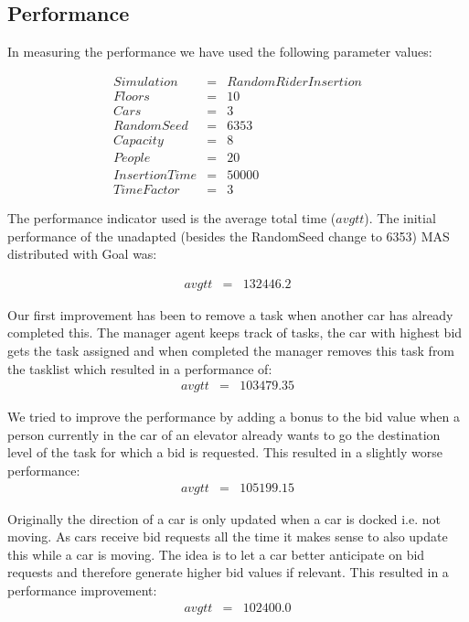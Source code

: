 \documentclass[a4paper,11pt]{article}
\begin{document}
\subsection{Performance}
In measuring the performance we have used the following parameter values:

\[\begin{array}{lcl}
Simulation & = & Random Rider Insertion\\
Floors & = & 10\\
Cars & = & 3\\
RandomSeed & = & 6353\\
Capacity & = & 8\\
People & = & 20\\
InsertionTime & = & 50000\\
TimeFactor & = & 3
\end{array}\] 

\pagebreak

The performance indicator used is the average total time ($avgtt$). The initial performance of the unadapted (besides the RandomSeed change to 6353) MAS distributed with Goal was:

\[\begin{array}{lcl}
avgtt & = & 132446.2
\end{array}\]

Our first improvement has been to remove a task when another car has already completed this. The manager agent keeps track of tasks, the car with highest bid gets the task assigned and when completed the manager removes this task from the tasklist which resulted in a performance of:
\[\begin{array}{lcl}
avgtt & = & 103479.35
\end{array}\]

We tried to improve the performance by adding a bonus to the bid value when a person currently in the car of an elevator already wants to go the destination level of the task for which a bid is requested. This resulted in a slightly worse performance:
\[\begin{array}{lcl}
avgtt & = & 105199.15
\end{array}\]

Originally the direction of a car is only updated when a car is docked i.e. not moving. As cars receive bid requests all the time it makes sense to also update this while a car is moving. The idea is to let a car better anticipate on bid requests and therefore generate higher bid values if relevant. This resulted in a performance improvement: 
\[\begin{array}{lcl}
avgtt & = & 102400.0
\end{array}\]
\end{document}
